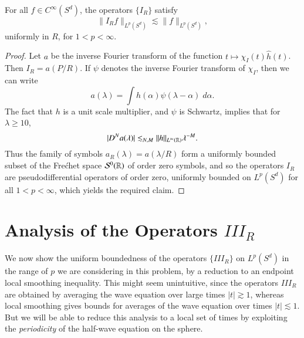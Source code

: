 \begin{lemma}
    For all $f \in C^\infty(S^d)$, the operators $\{ I_R \}$ satisfy
    \[ \| I_R f \|_{L^p(S^d)} \lesssim \| f \|_{L^p(S^d)}, \] 
    uniformly in $R$, for $1 < p < \infty$.
\end{lemma}
\begin{proof}
    Let $a$ be the inverse Fourier transform of the function $t \mapsto \chi_I(t) \widehat{h}(t)$. Then $I_R = a(P/R)$. If $\psi$ denotes the inverse Fourier transform of $\chi_I$, then we can write
    \[ a(\lambda) = \int h(\alpha) \psi(\lambda - \alpha)\; d\alpha. \]
    The fact that $h$ is a unit scale multiplier, and $\psi$ is Schwartz, implies that for $\lambda \geq 10$,
    \[ |D^N a(\lambda)| \lesssim_{N,M} \| h \|_{L^\infty(\operatorname{\mathbb{R}})} \lambda^{-M}. \]
    Thus the family of symbols $a_R(\lambda) = a(\lambda / R)$ form a uniformly bounded subset of the Fre\'{c}het space $\mathcal{S}^0(\operatorname{\mathbb{R}})$ of order zero symbols, and so the operators $I_R$ are pseudodifferential operators of order zero, uniformly bounded on $L^p(S^d)$ for all $1 < p < \infty$, which yields the required claim.
\end{proof}

\section{Analysis of the Operators $III_R$}

We now show the uniform boundedness of the operators $\{ III_R \}$ on $L^p(S^d)$ in the range of $p$ we are considering in this problem, by a reduction to an endpoint local smoothing inequality. This might seem unintuitive, since the operators $III_R$ are obtained by averaging the wave equation over large times $|t| \gtrsim 1$, whereas local smoothing gives bounds for averages of the wave equation over times $|t| \lesssim 1$. But we will be able to reduce this analysis to a local set of times by exploiting the \emph{periodicity} of the half-wave equation on the sphere.

